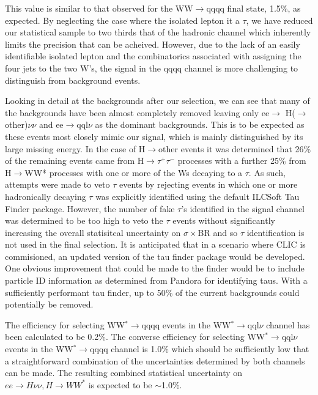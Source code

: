 This value is similar to that observed for the WW$\rightarrow$qqqq final state, 1.5\%, as expected. By neglecting the case where the isolated lepton it a $\tau$, we have reduced our statistical sample to two thirds that of the hadronic channel which inherently limits the precision that can be acheived. However, due to the lack of an easily identifiable isolated lepton and the combinatorics associated with assigning the four jets to the two W's, the signal in the qqqq channel is more challenging to distinguish from background events.

Looking in detail at the backgrounds after our selection, we can see that many of the backgrounds have been almost completely removed leaving only ee$\rightarrow$ H($\rightarrow$ other)$\nu\nu$ and ee$\rightarrow$qql$\nu$ as the dominant backgrounds. This is to be expected as these events most closely mimic our signal, which is mainly distinguished by its large missing energy. In the case of H$\rightarrow$other events it was determined that 26\% of the remaining events came from H$\rightarrow\tau^+\tau^-$ processes with a further 25\% from H$\rightarrow$WW* processes with one or more of the Ws decaying to a $\tau$. As such, attempts were made to veto $\tau$ events by rejecting events in which one or more hadronically decaying $\tau$ was explicitly identified using the default ILCSoft Tau Finder \cite{TauFinder} package. However, the number of fake $\tau$'s identified in the signal channel was determined to be too high to veto the $\tau$ events without significantly increasing the overall statisitcal uncertainty on $\sigma \times$BR and so $\tau$ identification is not used in the final selection. It is anticipated that in a scenario where \ac{CLIC} is commisioned, an updated version of the tau finder package would be developed. One obvious improvement that could be made to the finder would be to include particle ID information as determined from Pandora for identifying taus. With a sufficiently performant tau finder, up to 50\% of the current backgrounds could potentially be removed. 

The efficiency for selecting WW$^*\rightarrow$qqqq events in the WW$^*\rightarrow$qql$\nu$ channel has been calculated to be 0.2\%. The converse efficiency for selecting WW$^*\rightarrow$qql$\nu$ events in the WW$^*\rightarrow$qqqq channel is 1.0\% which should be sufficiently low that a straightforward combination of the uncertainties determined by both channels can be made. The resulting combined statistical uncertainty on $ee\rightarrow H\nu\nu, H\rightarrow WW^*$ is expected to be $\sim$1.0\%.

